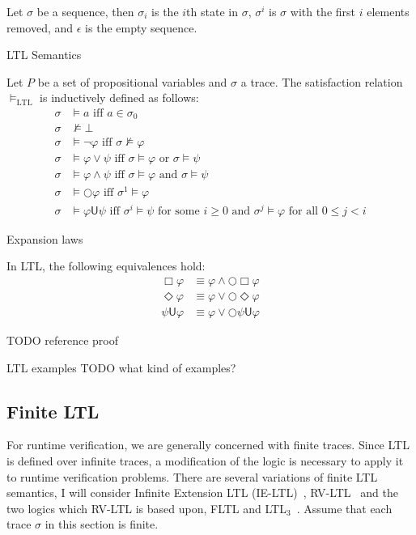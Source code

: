 \documentclass[a4paper]{article}
\newcommand{\U}{\mathsf{U}}
\newcommand{\tand}{\text{ and }}
\newcommand{\tor}{\text{ or }}
\newcommand{\tiff}{\text{ iff }}
\newcommand{\fsome}{\text{ for some }}
\newcommand{\fall}{\text{ for all }}
\begin{document}
\begin{notn}
Let $\sigma$ be a sequence, then $\sigma_i$ is the $i$th state in $\sigma$, $\sigma^i$ is $\sigma$ with the first $i$ elements removed, and $\epsilon$ is the empty sequence.
\end{notn}

\begin{defn}{LTL Semantics}\label{ltlsem}

  Let $P$ be a set of propositional variables and $\sigma$ a trace. The satisfaction relation $\vDash_{\text{LTL}}$ is inductively defined as follows:
\begin{align*}
  \sigma &\vDash a \tiff a \in \sigma_0\\
  \sigma &\nvDash \bot\\
  \sigma &\vDash \neg \varphi \tiff \sigma \nvDash \varphi\\
  \sigma &\vDash \varphi \lor \psi \tiff \sigma \vDash \varphi \tor \sigma \vDash \psi\\
  \sigma &\vDash \varphi \land \psi \tiff \sigma \vDash \varphi \tand \sigma \vDash \psi\\
  \sigma &\vDash \bigcirc \varphi \tiff \sigma^1 \vDash \varphi\\
  \sigma &\vDash \varphi \U \psi \tiff \sigma^i \vDash \psi \fsome i \geq 0 \tand \sigma^j \vDash \varphi \fall 0 \leq j < i
\end{align*}

\end{defn}

\begin{lem}{Expansion laws}\label{ltlexp}

  In LTL, the following equivalences hold:
  \begin{align}
    \Box \varphi &\equiv \varphi \land \bigcirc \Box \varphi\label{elbox}\\
    \Diamond \varphi &\equiv \varphi \lor \bigcirc \Diamond \varphi\label{eldiamond}\\
    \psi \U \varphi &\equiv \varphi \lor \bigcirc \psi \U \varphi\label{elU}
  \end{align}

\end{lem}

TODO reference proof

\begin{eg}{LTL examples}
  TODO what kind of examples?
\end{eg}


\subsection{Finite LTL}
For runtime verification, we are generally concerned with finite traces. Since LTL is defined over infinite traces, a modification of the logic is necessary to apply it to runtime verification problems. %
There are several variations of finite LTL semantics, I will consider Infinite Extension LTL (IE-LTL)~\autocite{rosu2005rewriting}, RV-LTL~\autocite{bauer2010comparing} and the two logics which RV-LTL is based upon, FLTL and LTL$_3$~\autocite{bauer2010comparing}.
Assume that each trace $\sigma$ in this section is finite.
\end{document}

